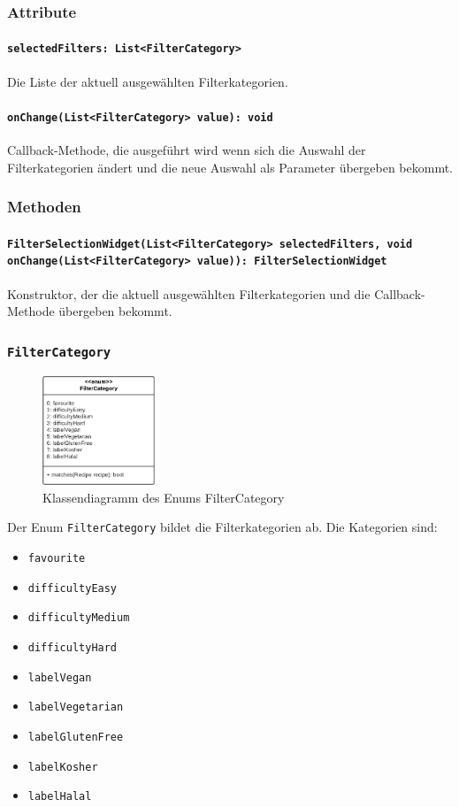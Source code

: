 \documentclass{entwurfsheft}
\begin{document}
\subsubsection*{Attribute}
\paragraph{\texttt{selectedFilters: List<FilterCategory>}}
Die Liste der aktuell ausgewählten Filterkategorien.
\paragraph{\texttt{onChange(List<FilterCategory> value): void}} Callback-Methode, die ausgeführt wird wenn sich die Auswahl der Filterkategorien ändert und die neue Auswahl als Parameter übergeben bekommt.
\subsubsection*{Methoden}
\paragraph{\texttt{FilterSelectionWidget(List<FilterCategory> selectedFilters, void onChange(List<FilterCategory> value)): FilterSelectionWidget}}
Konstruktor, der die aktuell ausgewählten Filterkategorien und die Callback-Methode übergeben bekommt.
\newpage

\subsubsection{\texttt{FilterCategory}}
\begin{figure}
    [htp]
    \centering
    \includegraphics[width=0.3\textwidth]{images/presentationLayer/classDiagrams/filterCategory.pdf}
    \caption{Klassendiagramm des Enums Filter\-Category}
\end{figure}
Der Enum \texttt{FilterCategory} bildet die Filterkategorien ab. Die Kategorien sind:
\begin{itemize}
    \item \texttt{favourite}
    \item \texttt{difficultyEasy}
    \item \texttt{difficultyMedium}
    \item \texttt{difficultyHard}
    \item \texttt{labelVegan}
    \item \texttt{labelVegetarian}
    \item \texttt{labelGlutenFree}
    \item \texttt{labelKosher}
    \item \texttt{labelHalal}
\end{itemize}
\end{document}
